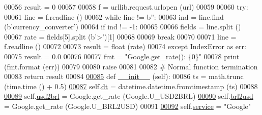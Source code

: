\begin{DoxyCode}
{{00056         result = 0
00057     
00058         f = urllib.request.urlopen (url)
00059         
00060         \textcolor{keywordflow}{try}:
00061             line = f.readline ()
00062             \textcolor{keywordflow}{while} line != b\textcolor{stringliteral}{''}:
00063                 ind = line.find (b\textcolor{stringliteral}{'currency\_converter'})
00064                 \textcolor{keywordflow}{if} ind != -1:
00065                     
00066                     fields = line.split ()
00067                     rate = fields[5].split (b\textcolor{stringliteral}{'>'})[1]
00068                     
00069                     \textcolor{keywordflow}{break}
00070                     
00071                 line = f.readline ()
00072             
00073             result = float (rate)
00074         \textcolor{keywordflow}{except} IndexError \textcolor{keyword}{as} err:
00075             result = 0.0
00076             
00077             fmt = \textcolor{stringliteral}{"Google.get\_rate(): \{0\}"}
00078             \textcolor{keywordflow}{print} (fmt.format (err))
00079             
00080             \textcolor{keywordflow}{raise}
00081         
00082         \textcolor{comment}{# Normal function termination}
00083         \textcolor{keywordflow}{return} result
00084 
\hypertarget{rates_8py_source.tex_l00085}{}\hyperlink{classrates_1_1_google_a6d9d023db3b4f6f2b585397e3469c396}{00085}     \textcolor{keyword}{def }\hyperlink{classrates_1_1_google_a6d9d023db3b4f6f2b585397e3469c396}{\_\_init\_\_} (self):
00086         ts = math.trunc (time.time () + 0.5)
\hypertarget{rates_8py_source.tex_l00087}{}\hyperlink{classrates_1_1_google_a76574be36237f78780f76bed53e69ab2}{00087}         self.\hyperlink{classrates_1_1_google_a76574be36237f78780f76bed53e69ab2}{dt} = datetime.datetime.fromtimestamp (ts)
00088                 
\hypertarget{rates_8py_source.tex_l00089}{}\hyperlink{classrates_1_1_google_a94c28f6d60d5d6afc075416d7378471c}{00089}         self.\hyperlink{classrates_1_1_google_a94c28f6d60d5d6afc075416d7378471c}{usd2brl} = Google.get\_rate (Google.U\_USD2BRL)
\hypertarget{rates_8py_source.tex_l00090}{}\hyperlink{classrates_1_1_google_a0979ffcb18b8bf3156cc5735c67ca6df}{00090}         self.\hyperlink{classrates_1_1_google_a0979ffcb18b8bf3156cc5735c67ca6df}{brl2usd} = Google.get\_rate (Google.U\_BRL2USD)
00091                 
\hypertarget{rates_8py_source.tex_l00092}{}\hyperlink{classrates_1_1_google_a1da08e36d5007aa5293d048b625a35e9}{00092}         self.\hyperlink{classrates_1_1_google_a1da08e36d5007aa5293d048b625a35e9}{service} = \textcolor{stringliteral}{"Google"}
}}
\end{DoxyCode}
